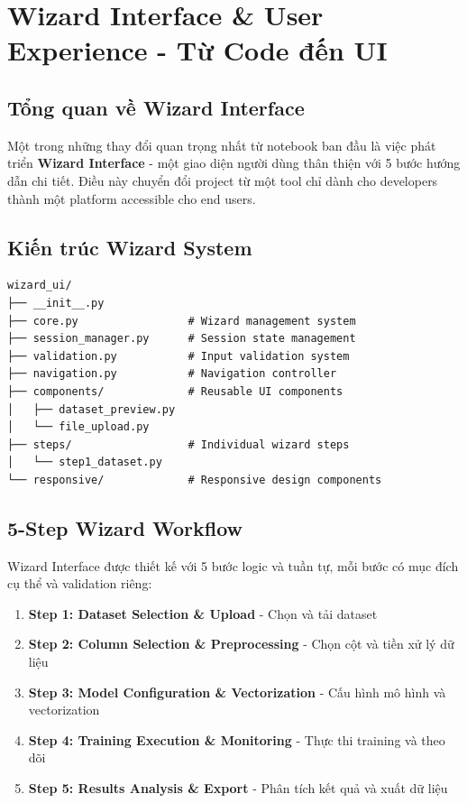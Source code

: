 \section{Wizard Interface \& User Experience - Từ Code đến UI}

\subsection{Tổng quan về Wizard Interface}

Một trong những thay đổi quan trọng nhất từ notebook ban đầu là việc phát triển \textbf{Wizard Interface} - một giao diện người dùng thân thiện với 5 bước hướng dẫn chi tiết. Điều này chuyển đổi project từ một tool chỉ dành cho developers thành một platform accessible cho end users.

\subsection{Kiến trúc Wizard System}

\begin{verbatim}
wizard_ui/
├── __init__.py
├── core.py                 # Wizard management system
├── session_manager.py      # Session state management
├── validation.py           # Input validation system
├── navigation.py           # Navigation controller
├── components/             # Reusable UI components
│   ├── dataset_preview.py
│   └── file_upload.py
├── steps/                  # Individual wizard steps
│   └── step1_dataset.py
└── responsive/             # Responsive design components
\end{verbatim}

\subsection{5-Step Wizard Workflow}

Wizard Interface được thiết kế với 5 bước logic và tuần tự, mỗi bước có mục đích cụ thể và validation riêng:

\begin{enumerate}
    \item \textbf{Step 1: Dataset Selection \& Upload} - Chọn và tải dataset
    \item \textbf{Step 2: Column Selection \& Preprocessing} - Chọn cột và tiền xử lý dữ liệu  
    \item \textbf{Step 3: Model Configuration \& Vectorization} - Cấu hình mô hình và vectorization
    \item \textbf{Step 4: Training Execution \& Monitoring} - Thực thi training và theo dõi
    \item \textbf{Step 5: Results Analysis \& Export} - Phân tích kết quả và xuất dữ liệu
\end{enumerate}

